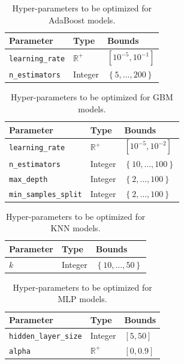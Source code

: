 \documentclass[runningheads,a4paper]{llncs}
\begin{document}
\begin{table}[ht]
\centering
\begin{tabular}{@{}lll@{}}
\toprule
\textbf{Parameter}             & \textbf{Type}  & \textbf{Bounds}                          \\ \midrule
\texttt{learning\_rate}      & $\mathbb{R}^+$ & $\left[10^{-5}, 10^{-1}\right]$                         \\
\texttt{n\_estimators}       & Integer        & $\left\lbrace 5,\dots, 200 \right\rbrace$
\end{tabular}
\caption{Hyper-parameters to be optimized for AdaBoost models.}
\label{adaparam}
\end{table}

\begin{table}[ht]
\centering
\begin{tabular}{@{}lll@{}}
\toprule
\textbf{Parameter}             & \textbf{Type}  & \textbf{Bounds}                          \\ \midrule
\texttt{learning\_rate}      & $\mathbb{R}^+$ & $\left[10^{-5}, 10^{-2}\right]$                         \\
\texttt{n\_estimators}       & Integer        & $\left\lbrace 10,\dots, 100 \right\rbrace$ \\
\texttt{max\_depth}          & Integer        & $\left\lbrace 2, \dots, 100 \right\rbrace$ \\
\texttt{min\_samples\_split}  & Integer        & $\left\lbrace 2, \dots, 100 \right\rbrace$
\end{tabular}
\caption{Hyper-parameters to be optimized for GBM models.}
\label{gbmparam}
\end{table}

\begin{table}[ht]
\centering
\begin{tabular}{@{}lll@{}}
\toprule
\textbf{Parameter} & \textbf{Type} & \textbf{Bounds}                           \\ \midrule
$k$                & Integer       & $\left\lbrace 10, \dots,50 \right\rbrace$
\end{tabular}
\caption{Hyper-parameters to be optimized for KNN models.}
\label{knnparam}
\end{table}

\begin{table}[ht]
\centering
\begin{tabular}{lll}
\hline
\textbf{Parameter}             & \textbf{Type}    & \textbf{Bounds}       \\ \hline
\texttt{hidden\_layer\_size} & Integer          & $\left[5, 50\right]$  \\
\texttt{alpha}               & $\mathbb{R}^{+}$ & $\left[0, 0.9\right]$
\end{tabular}
\caption{Hyper-parameters to be optimized for MLP models.}
\label{mlpparam}
\end{table}
\end{document}
